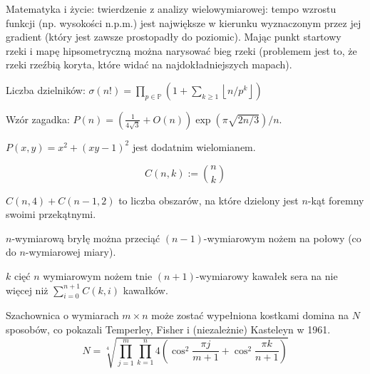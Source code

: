 \begin{parnumbers}
\begin{fkt}Matematyka i życie: twierdzenie z analizy wielowymiarowej: tempo wzrostu funkcji (np. wysokości n.p.m.) jest największe w kierunku wyznaczonym przez jej gradient (który jest zawsze prostopadły do poziomic). Mając punkt startowy rzeki i mapę hipsometryczną można narysować bieg rzeki (problemem jest to, że rzeki rzeźbią koryta, które widać na najdokładniejszych mapach).\end{fkt}












\begin{fkt} Liczba dzielników: $\sigma(n!) = \prod_{p\in \mathbb{P}} \left ( 1 + \sum_{k \ge1}\left\lfloor {n}/{p^k} \right\rfloor \right)$
\end{fkt}

\begin{fkt}Wzór zagadka: $P(n)=\left(\frac{1}{4\sqrt{3}} + O(n)\right){\exp \left({\pi \sqrt{{2n}/{3}}}\right)}/{n}$.\end{fkt}

\begin{fkt}$P(x,y) = x^2 + (xy - 1)^2$ jest dodatnim wielomianem.\end{fkt}

$$C(n,k):={n\choose k}$$

\begin{fkt}$C(n, 4) + C(n-1, 2)$ to liczba obszarów, na które dzielony jest $n$-kąt foremny swoimi przekątnymi.
\end{fkt}

\begin{fkt} $n$-wymiarową bryłę można przeciąć $(n-1)$-wymiarowym nożem na połowy (co do $n$-wymiarowej miary).\end{fkt}

\begin{fkt}$k$ cięć $n$ wymiarowym nożem tnie $(n+1)$-wymiarowy kawałek sera na nie więcej niż  $\sum _{i=0} ^{n+1} C(k,i)$ kawałków.\end{fkt}

\begin{fkt}Szachownica o wymiarach $m \times n$ może zostać wypełniona kostkami domina na $N$ sposobów, co pokazali Temperley, Fisher i (niezależnie) Kasteleyn w 1961.
\begin{equation*}
N=\sqrt[4]{\prod_{j=1}^m\prod_{k=1}^n 4 \left (\cos^2\frac{\pi j}{m+1} + \cos^2\frac{\pi k}{n+1}\right)}
\end{equation*}\end{fkt}


\end{parnumbers}
